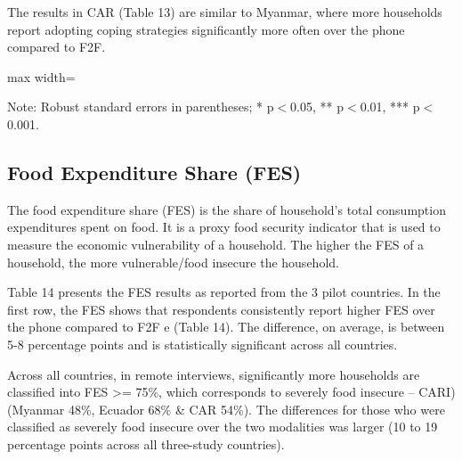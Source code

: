 \documentclass[11pt,harvard]{article}
\begin{document}
The results in CAR (Table 13) are similar to Myanmar, where more households  report adopting coping strategies significantly more often over the phone  compared to F2F. 
	
	\begin{table}[htbp]
		\centering
		\begin{adjustbox}{max width=\textwidth}
			\begin{threeparttable}
				\caption{CAR: Each Coping Strategy Used}
				\scriptsize
				 
				\label{tab:LCS_Ind_Modality_CAR}
				\begin{tablenotes}
					\item Note: Robust standard errors in parentheses; * p$<$0.05, ** p$<$0.01, *** p$<$0.001. 
				\end{tablenotes}
			\end{threeparttable}
		\end{adjustbox}
	\end{table}
	
	\pagebreak
	
\subsection{Food Expenditure Share (FES)}

The food expenditure share (FES) is the share of household’s total consumption expenditures spent on food. It is a proxy food security indicator that is used to measure the economic vulnerability of a household. The higher the FES of a household, the more vulnerable/food insecure the household.

Table 14 presents the FES results as reported from the 3 pilot countries. In the first row, the FES  shows that respondents consistently report higher FES over the phone compared to F2F e  (Table 14). The difference, on average, is between 5-8 percentage points and is statistically significant across all countries.

Across all countries, in remote interviews, significantly more households are classified  into FES >= 75\%, which corresponds to severely food insecure – CARI) (Myanmar 48\%, Ecuador 68\% \& CAR 54\%). The differences for those who were classified as severely food insecure over the two modalities was larger (10 to 19 percentage points across all three-study countries).
	
\end{document}
